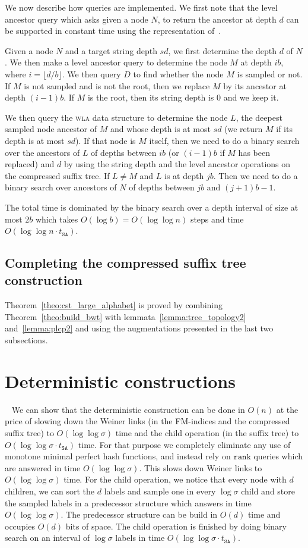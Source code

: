 \documentclass[a4paper]{article}
\begin{document}
We now describe how queries are implemented. We first note that the level ancestor query which asks given a node $N$, to return the ancestor at depth $d$ can be supported in constant time using the representation of~\cite{SNsoda10}. 

Given a node $N$ and a target string depth $\mathit{sd}$, we first determine the depth $d$ of $N$. We then make a level ancestor query to determine the node $M$ at depth $ib$, where $i=\lfloor d/b\rfloor$. We then query $D$ to find whether the node $M$ is sampled or not. If $M$ is not sampled and is not the root, then we replace $M$ by its ancestor at depth $(i-1)b$. If $M$ is the root, then its string depth is $0$ and we keep it. 

We then query the \textsc{wla} data structure to determine the node $L$, the deepest sampled node ancestor of $M$ and whose depth is at most $\mathit{sd}$ (we return $M$ if its depth is at most $\mathit{sd}$). If that node is $M$ itself, then we need to do a binary search over the ancestors of $L$ of depths between $ib$ (or $(i-1)b$ if $M$ has been replaced) and $d$ by using the string depth and the level ancestor operations on the compressed suffix tree. If $L\neq M$ and $L$ is at depth $jb$. Then we need to do a binary search over ancestors of $N$ of depths between $jb$ and $(j+1)b-1$. 

The total time is dominated by the binary search over a depth interval of size at most $2b$ which takes $O(\log b)=O(\log\log n)$ steps and time $O(\log\log n\cdot t_{\mathtt{SA}})$.
\subsection{Completing the compressed suffix tree construction}
Theorem~\ref{theo:cst_large_alphabet} is proved by combining Theorem~\ref{theo:build_bwt} with lemmata~\ref{lemma:tree_topology2} and~\ref{lemma:plcp2} and using the augmentations presented in the last two subsections. 

\section{Deterministic constructions}
~\label{sec:det_building}
We can show that the deterministic construction can be done in $O(n)$ at the price 
of slowing down the Weiner links (in the FM-indices and the compressed suffix tree) to $O(\log\log\sigma)$ time and the child operation (in the suffix tree) to $O(\log\log\sigma \cdot t_{\mathtt{SA}})$ time. For that purpose we completely eliminate 
any use of monotone minimal perfect hash functions, and instead rely on $\mathtt{rank}$ 
queries which are answered in time $O(\log\log\sigma)$. This slows down Weiner links to $O(\log\log\sigma)$
time. 
For the child operation, we notice that every node with $d$ children, we can sort the $d$ labels
and sample one in every $\log\sigma$ child and store the sampled labels in a predecessor 
structure which answers in time $O(\log\log\sigma)$. The predecessor structure can be build in $O(d)$
time and occupies $O(d)$ bits of space. The child operation is finished by doing binary search on 
an interval of $\log\sigma$ labels in time $O(\log\log\sigma\cdot t_{\mathtt{SA}})$. 
\end{document}
